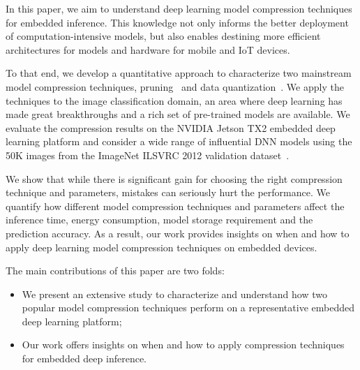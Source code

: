 In this paper, we aim to understand deep learning model compression techniques for embedded inference. This knowledge not only informs the
better deployment of computation-intensive models, but also enables destining more efficient architectures for models and hardware for
mobile and IoT devices.

To that end, we develop a quantitative approach  to characterize two mainstream model compression techniques, pruning~\cite{} and data
quantization~\cite{}. We apply the techniques to the image classification domain, an area where deep learning has made great breakthroughs
and a rich set of pre-trained models are available. We evaluate the compression results on the NVIDIA Jetson TX2 embedded deep learning
platform and consider a wide range of influential DNN models using the 50K images from the ImageNet ILSVRC 2012 validation dataset~\cite{}.


We show that while there is significant gain for choosing the right compression technique and parameters, mistakes can seriously hurt the
performance. We quantify how different model compression techniques and parameters affect the inference time, energy consumption, model
storage requirement and the prediction accuracy. As a result, our work provides insights on when and how to apply deep learning model
compression techniques on embedded devices.

The main contributions of this paper are two folds:

\begin{itemize}
\item We present an extensive study to characterize and understand how two popular model compression techniques perform on a
    representative embedded deep learning platform;
\item Our work offers insights on when and how to apply compression techniques for embedded deep inference.
\end{itemize}

